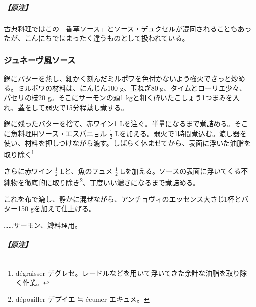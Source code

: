 \begin{recette}
\hypertarget{nota-sauce-aux-fines-herbes}{%
\subparagraph{【原注】}\label{nota-sauce-aux-fines-herbes}}

古典料理ではこの「香草ソース」と\protect\hyperlink{sauce-duxelles}{ソース・デュクセル}が混同されることもあったが、こんにちではまったく違うものとして扱われている。

\hypertarget{sauce-genevoise}{%
\subsubsection{ジュネーヴ風ソース}\label{sauce-genevoise}}



鍋にバターを熱し、細かく刻んだミルポワを色付かないよう強火でさっと炒める。ミルポワの材料は、にんじん100
g、玉ねぎ80 g、タイムとローリエ少々、パセリの枝20 g。そこにサーモンの頭1
kgと粗く砕いたこしょう1つまみを入れ、蓋をして弱火で15分程蒸し煮する。

鍋に残ったバターを捨て、赤ワイン1
Lを注ぐ。半量になるまで煮詰める。そこに\protect\hyperlink{sauce-espagnole-maigre}{魚料理用ソース・エスパニョル}
\(\frac{1}{2}\)
Lを加える。弱火で1時間煮込む。漉し器を使い、材料を押しつけながら漉す。しばらく休ませてから、表面に浮いた油脂を取り除く\footnote{dégraisser
  デグレセ。レードルなどを用いて浮いてきた余計な油脂を取り除く作業。}

さらに赤ワイン \(\frac{1}{2}\) Lと、魚のフュメ \(\frac{1}{2}\)
Lを加える。ソースの表面に浮いてくる不純物を徹底的に取り除き\footnote{dépouiller
  デプイエ ≒ écumer エキュメ。}、丁度いい濃さになるまで煮詰める。

これを布で漉し、静かに混ぜながら、アンチョヴィのエッセンス大さじ1杯とバター150
gを加えて仕上げる。

\ldots{}\ldots{}サーモン、鱒料理用。

\hypertarget{nota-sauce-genevoise}{%
\subparagraph{【原注】}\label{nota-sauce-genevoise}}


\end{recette}
